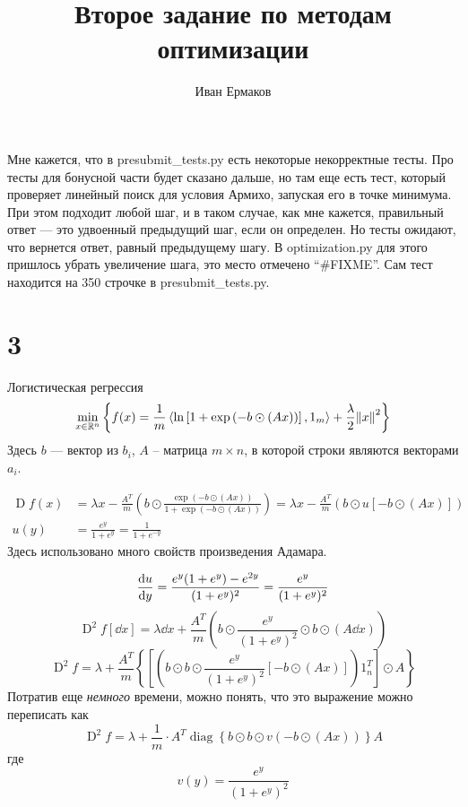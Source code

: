 \documentclass[notitlepage]{article}
\title{Второе задание по методам оптимизации}
\author{Иван Ермаков}
\date{}
\newcommand\inner[2]{\left\langle #1, #2 \right\rangle}
\begin{document}
\maketitle
Мне кажется, что в presubmit\_tests.py есть некоторые некорректные тесты.
Про тесты для бонусной части будет сказано дальше, но там еще есть тест, который проверяет линейный поиск для условия Армихо,
запуская его в точке минимума.
При этом подходит любой шаг, и в таком случае, как мне кажется, правильный ответ --- это удвоенный предыдущий шаг, если он определен.
Но тесты ожидают, что вернется ответ, равный предыдущему шагу.
В optimization.py для этого пришлось убрать увеличение шага, это место отмечено ``\#FIXME''.
Сам тест находится на 350 строчке в presubmit\_tests.py.


\section*{3}
Логистическая регрессия
\begin{equation}
  \min_{x \in \mathbb{R}^n} \left\{f(x) = \frac 1m\inner{\ln\left[1 + \exp\left(-b \odot \left(A x\right)\right)\right]}{1_m}
  + \frac{\lambda}2 \norm{x}^2\right\}
\end{equation}
Здесь $b$ --- вектор из $b_i$, $A$ -- матрица $m \times n$, в которой строки являются векторами $a_i$.

\begin{equation}
  \begin{aligned}
    \operatorname{D} f(x) &= \lambda x - \frac {A^T} m\left(b\odot\frac{\exp\left(-b \odot \left(A x\right)\right)}
  {1 + \exp\left(-b \odot \left(A x\right)\right)}\right) = 
  \lambda x - \frac {A^T} m\left(b\odot u\left[-b\odot \left(A x\right)\right]\right)\\
  u(y) &= \frac{e^y}{1 + e^y} = \frac1{1 + e^{-y}}
  \end{aligned}
\end{equation}
Здесь использовано много свойств произведения Адамара.

\begin{equation}
    \dv{u}{y} = \frac{e^y(1 + e^y) - e^{2y}}{(1 + e^y)^2} = \frac{e^y}{(1 + e^y)^2}\\
    \end{equation}
\begin{equation}
  \operatorname{D}^2 f[\dd x] = \lambda \dd x + \frac {A^T}m \left(b\odot \frac{e^y}{(1 + e^y)^2} \odot b \odot \left(A \dd x \right)\right)
    \end{equation}
\begin{equation}
  \operatorname{D}^2 f = 
  \lambda + \frac {A^T}m \left\{\left[\left(b \odot b \odot \frac{e^y}{(1 + e^y)^2}[-b \odot (Ax)]\right) 1_n^T\right] \odot A\right\}
\end{equation}
Потратив еще \textit{немного} времени, можно понять, что это выражение можно переписать как
\begin{equation}
  \operatorname{D}^2 f = \lambda + \frac 1m \cdot A^T \operatorname{diag}\left\{b\odot b \odot v(-b \odot \left(A x\right))\right\} A
\end{equation}
где
\begin{equation}
  v(y) = \frac{e^y}{(1 + e^y)^2}
\end{equation}
\end{document}
